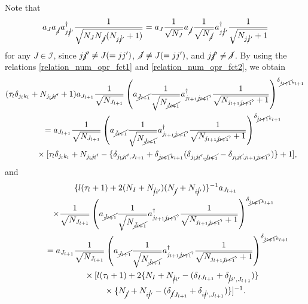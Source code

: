 \documentclass[pdftex]{sigma}
\numberwithin{equation}{section}
\begin{document}
Note that
\begin{align*}
a_{J}
a_{\cancel{J}}
a_{j\cancel{j}'}^{\dagger}
\frac{1}{
\sqrt{
N_{J}
N_{\cancel{J}}
 (
N_{j\cancel{j}'}+1
 )
}
}
=
a_{J}
\frac{1}{\sqrt{N_{J}}}
a_{\cancel{J}}
\frac{1}{\sqrt{N_{\cancel{J}}}}
a_{j\cancel{j}'}^{\dagger}
\frac{1}{\sqrt{N_{j\cancel{j}'}+1}}
\end{align*}
for any
$
J
\in
\mathcal{I}
$,
since
$
j\cancel{j}'
\neq
J
(=jj')
$,
$
\cancel{J}
\neq
J
(=jj')
$,
and
$
j\cancel{j}'
\neq
\cancel{J}
$.
By using the relations \eqref{relation_num_opr_fct1} and \eqref{relation_num_opr_fct2}, we obtain
\begin{gather*}
 (
 \tau_{l}
 \delta_{j_{l}k_{l}}
 +
 N_{j_{l}\cancel{j_{l}}'}
 +
 1
 )
 a_{J_{l+1}}
 \frac{1}{\sqrt{N_{J_{l+1}}}}
 \left(
 a_{\cancel{J_{l+1}}}
 \frac{1}{
 \sqrt{
 N_{\cancel{J_{l+1}}}
 }
 }
 a_{j_{l+1}\cancel{j_{l+1}}'}^{\dagger}
 \frac{1}{
 \sqrt{
 N_{j_{l+1}\cancel{j_{l+1}}'}+1
 }
 }
 \right)^{\delta_{\cancel{j_{l+1}}k_{l+1}}}
 \\
 \qquad=
 a_{J_{l+1}}
 \frac{1}{\sqrt{N_{J_{l+1}}}}
 \left(
 a_{\cancel{J_{l+1}}}
 \frac{1}{
 \sqrt{
 N_{\cancel{J_{l+1}}}
 }
 }
 a_{j_{l+1}\cancel{j_{l+1}}'}^{\dagger}
 \frac{1}{
 \sqrt{
 N_{j_{l+1}\cancel{j_{l+1}}'}+1
 }
 }
 \right)^{\delta_{\cancel{j_{l+1}}k_{l+1}}}
 \\
\phantom{ \qquad=}{} \times
 [
 \tau_{l}
 \delta_{j_{l}k_{l}}
 +
 N_{j_{l}\cancel{j_{l}}'}
 -
 \{
 \delta_{
 j_{l}\cancel{j_{l}}',
 J_{l+1}
 }
 +
 \delta_{\cancel{j_{l+1}}k_{l+1}}
 (
 \delta_{
 j_{l}\cancel{j_{l}}',
 \cancel{J_{l+1}}
 }
 -
 \delta_{
 j_{l}\cancel{j_{l}},
 j_{l+1}\cancel{j_{l+1}}'
 }
 )
 \}
 +
 1
 ],
\end{gather*}
and
\begin{gather*}
 \{
 l
 (
 \tau_{l}
 +
 1
 )
 +
 2
 (
 N_{I}
 +
 N_{\cancel{i}i'}
 )
 (
 N_{\cancel{I}}
 +
 N_{i\cancel{i}'}
 )
 \}^{-1}
 a_{J_{l+1}}\\
 \qquad\times
 \frac{1}{\sqrt{N_{J_{l+1}}}}
 \left(
 a_{\cancel{J_{l+1}}}
 \frac{1}{
 \sqrt{
 N_{\cancel{J_{l+1}}}
 }
 }
 a_{j_{l+1}\cancel{j_{l+1}}'}^{\dagger}
 \frac{1}{
 \sqrt{
 N_{j_{l+1}\cancel{j_{l+1}}'}+1
 }
 }
 \right)^{\delta_{\cancel{j_{l+1}}k_{l+1}}}
 \\
 \phantom{ \qquad\times}{}
 =
 a_{J_{l+1}}
 \frac{1}{\sqrt{N_{J_{l+1}}}}
 \left(
 a_{\cancel{J_{l+1}}}
 \frac{1}{
 \sqrt{
 N_{\cancel{J_{l+1}}}
 }
 }
 a_{j_{l+1}\cancel{j_{l+1}}'}^{\dagger}
 \frac{1}{
 \sqrt{
 N_{j_{l+1}\cancel{j_{l+1}}'}+1
 }
 }
 \right)^{\delta_{\cancel{j_{l+1}}k_{l+1}}}
 \\
 \phantom{ \qquad\times=}{}
 \times
 [
 l
 (
 \tau_{l}
 +
 1
 )
 +
 2
 \{
 N_{I}
 +
 N_{\cancel{i}i'}
 -
 (
 \delta_{IJ_{l+1}}
 +
 \delta_{\cancel{i}i',J_{l+1}}
 )
 \}\\
 \phantom{ \qquad=\times
 \times}{}\times
 \{
 N_{\cancel{I}}
 +
 N_{i\cancel{i}'}
 -
 (
 \delta_{\cancel{I}J_{l+1}}
 +
 \delta_{i\cancel{i}',J_{l+1}}
 )
 \}
 ]^{-1}
 .
\end{gather*}
\end{document}
